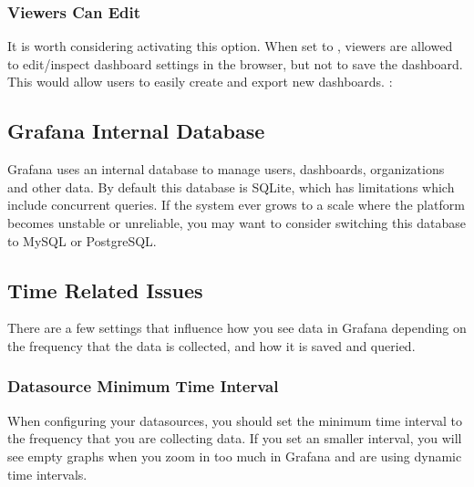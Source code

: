 \documentclass[letterpaper,10pt,english]{sphinxmanual}
\begin{document}
\begin{sphinxVerbatim}[commandchars=\\\{\}]
\PYG{p}{[}\PYG{p}{]}
    
\end{sphinxVerbatim}


\subsubsection{Viewers Can Edit}
\label{\detokenize{readme:viewers-can-edit}}
It is worth considering activating this option. When set to , viewers
are allowed to edit/inspect dashboard settings in the browser, but not to save
the dashboard. This would allow users to easily create and export new
dashboards.
:

\begin{sphinxVerbatim}[commandchars=\\\{\}]
\PYG{p}{[}\PYG{p}{]}
    
\end{sphinxVerbatim}


\subsection{Grafana Internal Database}
\label{\detokenize{readme:grafana-internal-database}}
Grafana uses an internal database to manage users, dashboards, organizations
and other data. By default this database is SQLite, which has limitations which
include concurrent queries. If the system ever grows to a scale where the
platform becomes unstable or unreliable, you may want to consider switching
this database to MySQL or PostgreSQL.


\subsection{Time Related Issues}
\label{\detokenize{readme:time-related-issues}}
There are a few settings that influence how you see data in Grafana depending
on the frequency that the data is collected, and how it is saved and queried.


\subsubsection{Datasource Minimum Time Interval}
\label{\detokenize{readme:datasource-minimum-time-interval}}
When configuring your datasources, you should set the minimum time interval to
the frequency that you are collecting data. If you set an smaller interval, you
will see empty graphs when you zoom in too much in Grafana and are using
dynamic time intervals.
\end{document}
